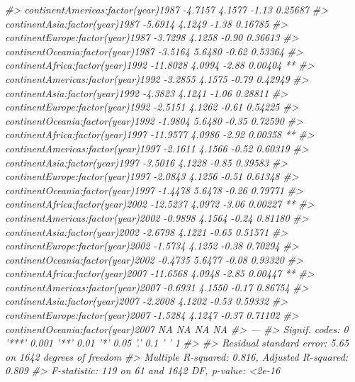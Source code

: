 \documentclass[
]{book}
\newenvironment{Shaded}{\begin{snugshade}}{\end{snugshade}}
\newcommand{\CommentTok}[1]{\textcolor[rgb]{0.56,0.35,0.01}{\textit{#1}}}
\begin{document}
\begin{Shaded}
\begin{Highlighting}[]
\CommentTok{#> continentAmericas:factor(year)1987  -4.7157     4.1577   -1.13  0.25687    }
\CommentTok{#> continentAsia:factor(year)1987      -5.6914     4.1249   -1.38  0.16785    }
\CommentTok{#> continentEurope:factor(year)1987    -3.7298     4.1258   -0.90  0.36613    }
\CommentTok{#> continentOceania:factor(year)1987   -3.5164     5.6480   -0.62  0.53364    }
\CommentTok{#> continentAfrica:factor(year)1992   -11.8028     4.0994   -2.88  0.00404 ** }
\CommentTok{#> continentAmericas:factor(year)1992  -3.2855     4.1575   -0.79  0.42949    }
\CommentTok{#> continentAsia:factor(year)1992      -4.3823     4.1241   -1.06  0.28811    }
\CommentTok{#> continentEurope:factor(year)1992    -2.5151     4.1262   -0.61  0.54225    }
\CommentTok{#> continentOceania:factor(year)1992   -1.9804     5.6480   -0.35  0.72590    }
\CommentTok{#> continentAfrica:factor(year)1997   -11.9577     4.0986   -2.92  0.00358 ** }
\CommentTok{#> continentAmericas:factor(year)1997  -2.1611     4.1566   -0.52  0.60319    }
\CommentTok{#> continentAsia:factor(year)1997      -3.5016     4.1228   -0.85  0.39583    }
\CommentTok{#> continentEurope:factor(year)1997    -2.0843     4.1256   -0.51  0.61348    }
\CommentTok{#> continentOceania:factor(year)1997   -1.4478     5.6478   -0.26  0.79771    }
\CommentTok{#> continentAfrica:factor(year)2002   -12.5237     4.0972   -3.06  0.00227 ** }
\CommentTok{#> continentAmericas:factor(year)2002  -0.9898     4.1564   -0.24  0.81180    }
\CommentTok{#> continentAsia:factor(year)2002      -2.6798     4.1221   -0.65  0.51571    }
\CommentTok{#> continentEurope:factor(year)2002    -1.5734     4.1252   -0.38  0.70294    }
\CommentTok{#> continentOceania:factor(year)2002   -0.4735     5.6477   -0.08  0.93320    }
\CommentTok{#> continentAfrica:factor(year)2007   -11.6568     4.0948   -2.85  0.00447 ** }
\CommentTok{#> continentAmericas:factor(year)2007  -0.6931     4.1550   -0.17  0.86754    }
\CommentTok{#> continentAsia:factor(year)2007      -2.2008     4.1202   -0.53  0.59332    }
\CommentTok{#> continentEurope:factor(year)2007    -1.5284     4.1247   -0.37  0.71102    }
\CommentTok{#> continentOceania:factor(year)2007        NA         NA      NA       NA    }
\CommentTok{#> ---}
\CommentTok{#> Signif. codes:  0 '***' 0.001 '**' 0.01 '*' 0.05 '.' 0.1 ' ' 1}
\CommentTok{#> }
\CommentTok{#> Residual standard error: 5.65 on 1642 degrees of freedom}
\CommentTok{#> Multiple R-squared:  0.816,  Adjusted R-squared:  0.809 }
\CommentTok{#> F-statistic:  119 on 61 and 1642 DF,  p-value: <2e-16}
\end{Highlighting}
\end{Shaded}
\end{document}

